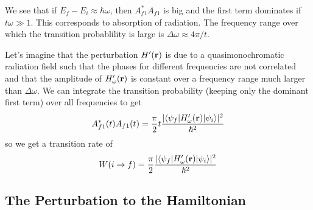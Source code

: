 We see that if $E_f - E_i \approx \hbar \omega$, then 
$A^*_{f1}A_{f1}$ is big and the first term dominates if $t\omega \gg
1$.  This corresponds to absorption of radiation.
The frequency range over which the
transition probablility is large is $\Delta \omega \approx 4\pi/t$.

Let's imagine that the perturbation $H'({\bf r})$ is due to a
quasimonochromatic radiation field such that the phases for different
frequencies are not correlated and that the amplitude of 
$H'_\omega({\bf r})$ is constant over a frequency range much larger
than $\Delta \omega$.  We can integrate the transition probability
(keeping only the dominant first term)
over all frequencies to get
\begin{equation}
A^*_{f1}(t) A_{f1}(t) = \frac{\pi}{2} t  \frac{|\langle\psi_f | H'_\omega({\bf r})
  |\psi_i \rangle |^2}{\hbar^2}
\label{eq:507}
\end{equation}
so we get a transition rate of 
\begin{equation}
W(i\rightarrow f)=  \frac{\pi}{2}  \frac{|\langle\psi_f | H'_\omega({\bf r})
  |\psi_i \rangle |^2}{\hbar^2}
\label{eq:508}
\end{equation}

\subsection{The Perturbation to the Hamiltonian}
\label{sec:pert-hamilt}

